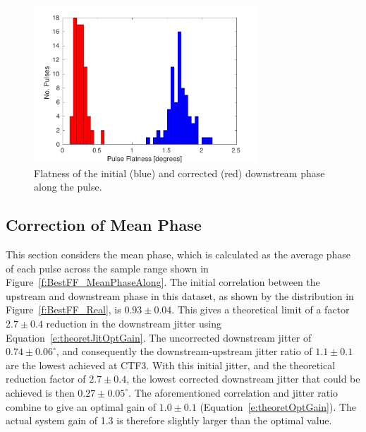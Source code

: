 \begin{figure}
  \centering
  \includegraphics[width=0.75\textwidth]{Figures/feedforward/BestFF_Flatness}
  \caption{Flatness of the initial (blue) and corrected (red) downstream phase along the pulse.}
  \label{f:BestFF_Flatness}
\end{figure}

\subsection{Correction of Mean Phase}
\label{ss:bestMeanJitter}

This section considers the mean phase, which is calculated as the average phase of each pulse across the sample range shown in Figure~\ref{f:BestFF_MeanPhaseAlong}. The initial correlation between the upstream and downstream phase in this dataset, as shown by the  distribution in Figure~\ref{f:BestFF_Real}, is \(0.93\pm0.04\). This gives a theoretical limit of a factor \(2.7\pm0.4\) reduction in the downstream jitter using Equation~\ref{e:theoretJitOptGain}. The uncorrected downstream jitter of \(0.74\pm0.06^\circ\), and consequently the downstream-upstream jitter ratio of \(1.1\pm0.1\) are the lowest achieved at CTF3. With this initial jitter, and the theoretical reduction factor of \(2.7\pm0.4\), the lowest corrected downstream jitter that could be achieved is then \(0.27\pm0.05^\circ\). The aforementioned correlation and jitter ratio combine to give an optimal gain of \(1.0\pm0.1\) (Equation~\ref{e:theoretOptGain}). The actual system gain of 1.3 is therefore slightly larger than the optimal value.

